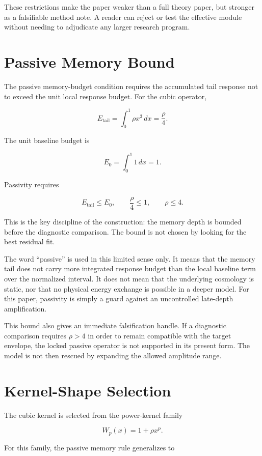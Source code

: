 \documentclass[11pt]{article}
\begin{document}
These restrictions make the paper weaker than a full theory paper, but stronger
as a falsifiable method note. A reader can reject or test the effective module
without needing to adjudicate any larger research program.

\section{Passive Memory Bound}

The passive memory-budget condition requires the accumulated tail response not
to exceed the unit local response budget. For the cubic operator,

\[
E_{\mathrm{tail}} = \int_0^1 \rho x^3\,dx = \frac{\rho}{4}.
\]

The unit baseline budget is

\[
E_0 = \int_0^1 1\,dx = 1.
\]

Passivity requires

\[
E_{\mathrm{tail}} \leq E_0,\qquad
\frac{\rho}{4} \leq 1,\qquad
\rho \leq 4 .
\]

This is the key discipline of the construction: the memory depth is bounded
before the diagnostic comparison. The bound is not chosen by looking for the
best residual fit.

The word ``passive'' is used in this limited sense only. It means that the memory
tail does not carry more integrated response budget than the local baseline
term over the normalized interval. It does not mean that the underlying
cosmology is static, nor that no physical energy exchange is possible in a
deeper model. For this paper, passivity is simply a guard against an
uncontrolled late-depth amplification.

This bound also gives an immediate falsification handle. If a diagnostic
comparison requires $\rho > 4$ in order to remain compatible with the target
envelope, the locked passive operator is not supported in its present form. The
model is not then rescued by expanding the allowed amplitude range.

\section{Kernel-Shape Selection}

The cubic kernel is selected from the power-kernel family

\[
W_p(x) = 1 + \rho x^p .
\]

For this family, the passive memory rule generalizes to
\end{document}
